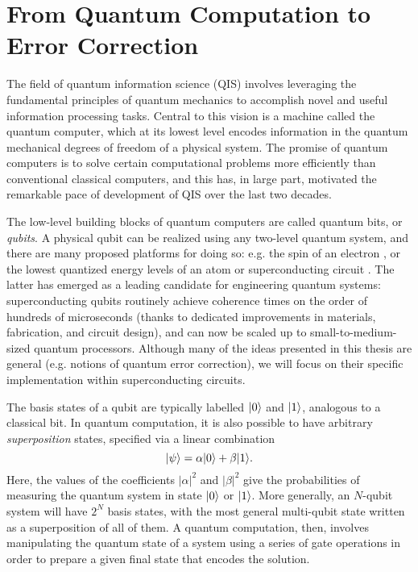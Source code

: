 \section{From Quantum Computation to Error Correction}

The field of quantum information science (QIS) involves leveraging the fundamental principles of quantum mechanics to accomplish novel and useful information processing tasks. Central to this vision is a machine called the quantum computer, which at its lowest level encodes information in the quantum mechanical degrees of freedom of a physical system. The promise of quantum computers is to solve certain computational problems more efficiently than conventional classical computers, and this has, in large part, motivated the remarkable pace of development of QIS over the last two decades. 

The low-level building blocks of quantum computers are called quantum bits, or \textit{qubits}. A physical qubit can be realized using any two-level quantum system, and there are many proposed platforms for doing so: e.g. the spin of an electron \cite{burkard2023semiconductor}, or the lowest quantized energy levels of an atom \cite{briegel2000quantum} or superconducting circuit \cite{devoret2013superconducting, krantz2019quantum, kjaergaard2020superconducting}. The latter has emerged as a leading candidate for engineering quantum systems: superconducting qubits routinely achieve coherence times on the order of hundreds of microseconds \cite{kjaergaard2020superconducting} (thanks to dedicated improvements in materials, fabrication, and circuit design), and can now be scaled up to small-to-medium-sized quantum processors. Although many of the ideas presented in this thesis are general (e.g. notions of quantum error correction), we will focus on their specific implementation within superconducting circuits. 

The basis states of a qubit are typically labelled $\lvert0\rangle$ and $\lvert1\rangle$, analogous to a classical bit. In quantum computation, it is also possible to have arbitrary \textit{superposition} states, specified via a linear combination
\begin{equation}
    \lvert\psi\rangle = \alpha\lvert0\rangle + \beta\lvert1\rangle.
\end{equation}
Here, the values of the coefficients $|\alpha|^2$ and $|\beta|^2$ give the probabilities of measuring the quantum system in state $\lvert0\rangle$ or $\lvert1\rangle$. More generally, an $N$-qubit system will have $2^N$ basis states, with the most general multi-qubit state written as a superposition of all of them. A quantum computation, then, involves manipulating the quantum state of a system using a series of gate operations in order to prepare a given final state that encodes the solution. 


